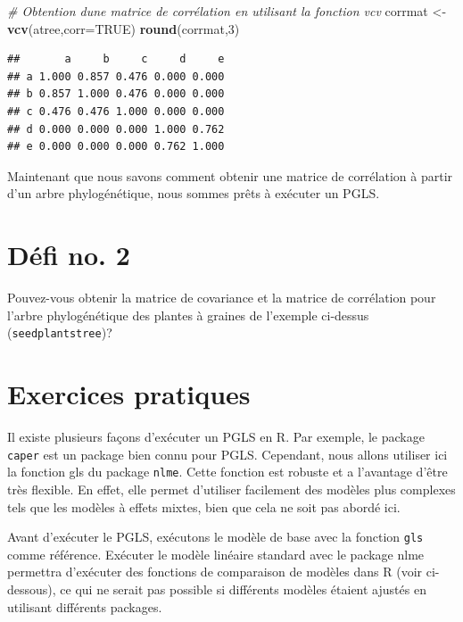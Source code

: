 \documentclass[
]{book}
\newenvironment{Shaded}{\begin{snugshade}}{\end{snugshade}}
\newcommand{\AttributeTok}[1]{\textcolor[rgb]{0.13,0.29,0.53}{#1}}
\newcommand{\CommentTok}[1]{\textcolor[rgb]{0.56,0.35,0.01}{\textit{#1}}}
\newcommand{\ConstantTok}[1]{\textcolor[rgb]{0.56,0.35,0.01}{#1}}
\newcommand{\DecValTok}[1]{\textcolor[rgb]{0.00,0.00,0.81}{#1}}
\newcommand{\FunctionTok}[1]{\textcolor[rgb]{0.13,0.29,0.53}{\textbf{#1}}}
\newcommand{\NormalTok}[1]{#1}
\newcommand{\OtherTok}[1]{\textcolor[rgb]{0.56,0.35,0.01}{#1}}
\begin{document}
\begin{Shaded}
\begin{Highlighting}[]
\CommentTok{\# Obtention d\textquotesingle{}une matrice de corrélation en utilisant la fonction \textquotesingle{}vcv\textquotesingle{}}
\NormalTok{corrmat }\OtherTok{\textless{}{-}} \FunctionTok{vcv}\NormalTok{(atree,}\AttributeTok{corr=}\ConstantTok{TRUE}\NormalTok{)}
\FunctionTok{round}\NormalTok{(corrmat,}\DecValTok{3}\NormalTok{)}
\end{Highlighting}
\end{Shaded}

\begin{verbatim}
##       a     b     c     d     e
## a 1.000 0.857 0.476 0.000 0.000
## b 0.857 1.000 0.476 0.000 0.000
## c 0.476 0.476 1.000 0.000 0.000
## d 0.000 0.000 0.000 1.000 0.762
## e 0.000 0.000 0.000 0.762 1.000
\end{verbatim}

Maintenant que nous savons comment obtenir une matrice de corrélation à partir d'un arbre phylogénétique, nous sommes prêts à exécuter un PGLS.

\section{Défi no. 2}\label{duxe9fi-no.-2}

Pouvez-vous obtenir la matrice de covariance et la matrice de corrélation pour l'arbre phylogénétique des plantes à graines de l'exemple ci-dessus (\texttt{seedplantstree})?

\section{Exercices pratiques}\label{exercices-pratiques}

Il existe plusieurs façons d'exécuter un PGLS en R. Par exemple, le package \texttt{caper} est un package bien connu pour PGLS. Cependant, nous allons utiliser ici la fonction gls du package \texttt{nlme}. Cette fonction est robuste et a l'avantage d'être très flexible. En effet, elle permet d'utiliser facilement des modèles plus complexes tels que les modèles à effets mixtes, bien que cela ne soit pas abordé ici.

Avant d'exécuter le PGLS, exécutons le modèle de base avec la fonction \texttt{gls} comme référence. Exécuter le modèle linéaire standard avec le package nlme permettra d'exécuter des fonctions de comparaison de modèles dans R (voir ci-dessous), ce qui ne serait pas possible si différents modèles étaient ajustés en utilisant différents packages.
\end{document}

